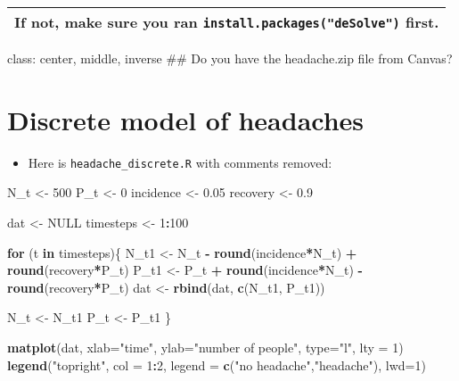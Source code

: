 \documentclass[]{article}
\newenvironment{Shaded}{\begin{snugshade}}{\end{snugshade}}
\newcommand{\KeywordTok}[1]{\textcolor[rgb]{0.13,0.29,0.53}{\textbf{#1}}}
\newcommand{\DataTypeTok}[1]{\textcolor[rgb]{0.13,0.29,0.53}{#1}}
\newcommand{\DecValTok}[1]{\textcolor[rgb]{0.00,0.00,0.81}{#1}}
\newcommand{\FloatTok}[1]{\textcolor[rgb]{0.00,0.00,0.81}{#1}}
\newcommand{\StringTok}[1]{\textcolor[rgb]{0.31,0.60,0.02}{#1}}
\newcommand{\OtherTok}[1]{\textcolor[rgb]{0.56,0.35,0.01}{#1}}
\newcommand{\ControlFlowTok}[1]{\textcolor[rgb]{0.13,0.29,0.53}{\textbf{#1}}}
\newcommand{\OperatorTok}[1]{\textcolor[rgb]{0.81,0.36,0.00}{\textbf{#1}}}
\newcommand{\NormalTok}[1]{#1}
\providecommand{\tightlist}{%
  \setlength{\itemsep}{0pt}\setlength{\parskip}{0pt}}
\begin{document}
\begin{longtable}[]{@{}l@{}}
\toprule
\begin{minipage}[t]{0.03\columnwidth}\raggedright\strut
If not, make sure you ran \texttt{install.packages("deSolve")}
first.\strut
\end{minipage}\tabularnewline
\bottomrule
\end{longtable}

class: center, middle, inverse \#\# Do you have the headache.zip file
from Canvas?

\section{Discrete model of headaches}\label{discrete-model-of-headaches}

\begin{itemize}
\tightlist
\item
  Here is \texttt{headache\_discrete.R} with comments removed:
\end{itemize}

\begin{Shaded}
\begin{Highlighting}[]
\NormalTok{N_t <-}\StringTok{ }\DecValTok{500}      
\NormalTok{P_t <-}\StringTok{ }\DecValTok{0}        
\NormalTok{incidence <-}\StringTok{ }\FloatTok{0.05} 
\NormalTok{recovery <-}\StringTok{ }\FloatTok{0.9}    

\NormalTok{dat <-}\StringTok{ }\OtherTok{NULL}
\NormalTok{timesteps <-}\StringTok{ }\DecValTok{1}\OperatorTok{:}\DecValTok{100}

\ControlFlowTok{for}\NormalTok{ (t }\ControlFlowTok{in}\NormalTok{ timesteps)\{}
\NormalTok{    N_t1 <-}\StringTok{ }\NormalTok{N_t }\OperatorTok{-}\StringTok{ }\KeywordTok{round}\NormalTok{(incidence}\OperatorTok{*}\NormalTok{N_t) }\OperatorTok{+}\StringTok{ }\KeywordTok{round}\NormalTok{(recovery}\OperatorTok{*}\NormalTok{P_t) }
\NormalTok{    P_t1 <-}\StringTok{ }\NormalTok{P_t }\OperatorTok{+}\StringTok{ }\KeywordTok{round}\NormalTok{(incidence}\OperatorTok{*}\NormalTok{N_t) }\OperatorTok{-}\StringTok{ }\KeywordTok{round}\NormalTok{(recovery}\OperatorTok{*}\NormalTok{P_t)}
\NormalTok{    dat <-}\StringTok{ }\KeywordTok{rbind}\NormalTok{(dat, }\KeywordTok{c}\NormalTok{(N_t1, P_t1)) }
    
\NormalTok{    N_t <-}\StringTok{ }\NormalTok{N_t1 }
\NormalTok{    P_t <-}\StringTok{ }\NormalTok{P_t1 }
\NormalTok{\}}

\KeywordTok{matplot}\NormalTok{(dat, }\DataTypeTok{xlab=}\StringTok{"time"}\NormalTok{, }\DataTypeTok{ylab=}\StringTok{"number of people"}\NormalTok{, }\DataTypeTok{type=}\StringTok{"l"}\NormalTok{, }\DataTypeTok{lty =} \DecValTok{1}\NormalTok{)}
\KeywordTok{legend}\NormalTok{(}\StringTok{"topright"}\NormalTok{, }\DataTypeTok{col =} \DecValTok{1}\OperatorTok{:}\DecValTok{2}\NormalTok{, }\DataTypeTok{legend =} \KeywordTok{c}\NormalTok{(}\StringTok{"no headache"}\NormalTok{,}\StringTok{"headache"}\NormalTok{), }\DataTypeTok{lwd=}\DecValTok{1}\NormalTok{)}
\end{Highlighting}
\end{Shaded}
\end{document}
